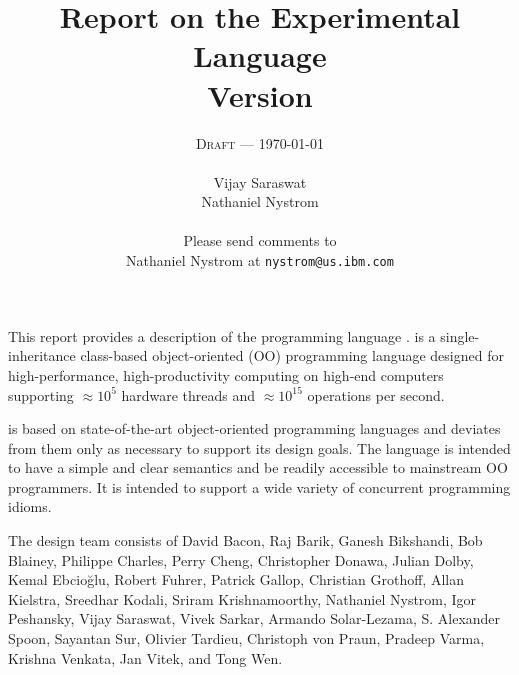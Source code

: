 
\thispagestyle{empty}


\title{Report on the Experimental Language \Xten \\
\large Version \integerversion}
\author{\textsc{Draft} --- \today \\
\\
Vijay Saraswat \\
Nathaniel Nystrom \\
\\
Please send comments to \\
Nathaniel Nystrom at \texttt{nystrom@us.ibm.com}}
\date{}

\maketitle

\newcommand\authorsc[1]{#1}

This report provides a description of the programming
language \Xten. \Xten{} is a single-inheritance class-based object-oriented
(OO) programming language designed for high-performance, high-productivity
computing on high-end computers supporting $\approx 10^5$ hardware threads
and $\approx 10^{15}$ operations per second. 

{}\Xten{} is based on state-of-the-art object-oriented programming
languages and deviates from them only as necessary to support its
design goals. The language is intended to have a simple and clear
semantics and be readily accessible to mainstream OO programmers. It
is intended to support a wide variety of concurrent programming
idioms.


The \Xten{} design team consists of
\authorsc{David Bacon}, 
\authorsc{Raj Barik}, 
\authorsc{Ganesh Bikshandi}, 
\authorsc{Bob Blainey}, 
\authorsc{Philippe Charles}, 
\authorsc{Perry Cheng}, 
\authorsc{Christopher Donawa}, 
\authorsc{Julian Dolby}, 
\authorsc{Kemal Ebcio\u{g}lu},
\authorsc{Robert Fuhrer},
\authorsc{Patrick Gallop}, 
\authorsc{Christian Grothoff}, 
\authorsc{Allan Kielstra}, 
\authorsc{Sreedhar Kodali}, 
\authorsc{Sriram Krishnamoorthy}, 
\authorsc{Nathaniel Nystrom},
\authorsc{Igor Peshansky}, 
\authorsc{Vijay Saraswat},
\authorsc{Vivek Sarkar},
\authorsc{Armando Solar-Lezama},  
\authorsc{S. Alexander Spoon}, 
\authorsc{Sayantan Sur}, 
\authorsc{Olivier Tardieu},
\authorsc{Christoph von Praun},
\authorsc{Pradeep Varma},
\authorsc{Krishna Venkata},
\authorsc{Jan Vitek}, and
\authorsc{Tong Wen}.

